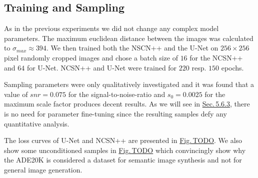 \subsection{Training and Sampling}
As in the previous experiments we did not change any complex model parameters. The maximum euclidean distance between the images was calculated to $\sigma_{max}\approx394$. We then trained both the NSCN++ and the U-Net on $256\times256$ pixel randomly cropped images and chose a batch size of $16$ for the NCSN++ and $64$ for U-Net. NCSN++ and U-Net were trained for $220$ resp. $150$ epochs.

Sampling parameters were only qualitatively investigated and it was found that a value of $snr=0.075$ for the signal-to-noise-ratio and $s_0=0.0025$ for the maximum scale factor produces decent results. As we will see in \hyperref[sec:5.6.3]{Sec.\,5.6.3}, there is no need for parameter fine-tuning since the resulting samples defy any quantitative analysis.

The loss curves of U-Net and NCSN++ are presented in \hyperref[fig:]{Fig.\,TODO}. We also show some unconditioned samples in \hyperref[fig:]{Fig.\,TODO} which convincingly show why the ADE20K is considered a dataset for semantic image synthesis and not for general image generation.

